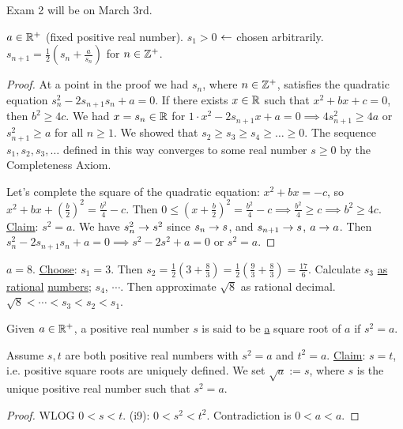 \documentclass[]{article}
\begin{document}
Exam 2 will  be on March 3rd.

\begin{recall}
	$a\in\mathbb{R}^+$ (fixed positive real number). $s_1>0$ $\leftarrow$ chosen arbitrarily. $s_{n+1} = \frac{1}{2}\left(s_n + \frac{a}{s_n} \right)$ for $n\in\mathbb{Z}^+$.
\end{recall}
\begin{proof}
	At a point in the proof we had $s_n$, where $n\in\mathbb{Z}^+$, satisfies the quadratic equation $s_n^2 - 2s_{n+1} s_n + a=0$.
	If there exists $x\in\mathbb{R}$ such that $x^2 + bx + c = 0$, then $b^2 \geq 4c$.
	We had $x=s_n \in \mathbb{R}$ for $1\cdot x^2 - 2s_{n+1} x + a = 0 \implies 4s_{n+1}^2 \geq 4a$ or $s_{n+1}^2 \geq a$ for all $n\geq 1$. We showed that $s_2 \geq s_3 \geq s_4 \geq \dots \geq 0$. The sequence $s_1,s_2,s_3,\dots$ defined in this way converges to some real number $s \geq 0$ by the Completeness Axiom.
	
	Let's complete the square of the quadratic equation: $x^2+bx=-c$, so $x^2 + bx + \left(\frac{b}{2}\right)^2 = \frac{b^2}{4} - c$. Then $0\leq \left( x + \frac{b}{2} \right)^2 = \frac{b^2}{4} -c \implies \frac{b^2}{4} \geq c \implies b^2 \geq 4c$.
	\ul{Claim}: $s^2 = a$. We have $s_n^2 \rightarrow s^2$ since $s_n \rightarrow s$, and $s_{n+1} \rightarrow s$, $a\rightarrow a$. Then $s_n^2 - 2s_{n+1} s_n + a = 0 \implies s^2-2s^2 + a = 0$ or $s^2 = a$.
\end{proof}

\begin{example}
	[HW] $a = 8$. \ul{Choose}: $s_1 = 3$. Then $s_2 = \frac{1}{2} \left( 3 + \frac{8}{3} \right) = \frac{1}{2} \left( \frac{9}{3} + \frac{8}{3} \right) = \frac{17}{6}$. Calculate $s_3$ \ul{as rational} \ul{numbers}; $s_4$, $\cdots$. Then approximate $\sqrt{8}$ as rational decimal. $\sqrt{8} < \cdots< s_3 < s_2 < s_1$.
\end{example}

\begin{definition}
	Given $a\in\mathbb{R}^+$, a positive real number $s$ is said to be \ul{a} square root of $a$ if $s^2 = a$.
\end{definition}
\begin{proposition}
	Assume $s,t$ are both positive real numbers with $s^2 = a$ and $t^2 = a$.
	\ul{Claim}: $s=t$, i.e. positive square roots are uniquely defined.
	We set $\sqrt{a}:=s$, where $s$ is the unique positive real number such that $s^2=a$.
\end{proposition}
\begin{proof}
	WLOG $0<s<t$. (i9): $0<s^2<t^2$. Contradiction is $0<a<a$.
\end{proof}
\newpage
\end{document}

